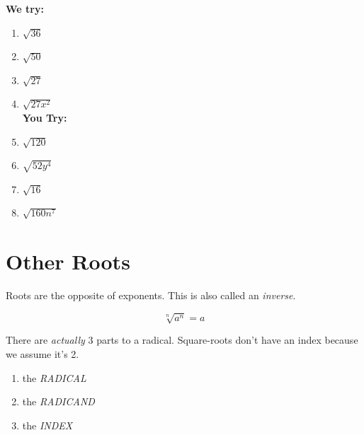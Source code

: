 \documentclass[12pt]{article}
\begin{document}
\begin{multicols}{2}
\textbf{We try:}\\

\begin{enumerate}
	\setlength\itemsep{1cm}

	\item $\sqrt{36}$\\
	
	
	\item $\sqrt{50}$\\
	
	
	\item $\sqrt{27}$\\
	
	
	\item $\sqrt{27x^2}$\\
	
		
\textbf{You Try:}\\
	
	\item  $\sqrt{120}$ \\
	
	
	\item $\sqrt{52y^4}$\\
	
	
	\item $\sqrt{16}$\\
	
	
	\item $\sqrt{160n^7}$\\
	
	

\end{enumerate}
\end{multicols}


\section{Other Roots}

Roots are the opposite of exponents. This is also called an \textit{inverse}.\\

\begin{LARGE}
	$$\sqrt[n]{a^n}=a$$
\end{LARGE}



\hrulefill

There are \textit{actually} 3 parts to a radical. Square-roots don't have an index because we assume it's 2.

\begin{enumerate}

	\item the \textit{RADICAL}\\
	
	\item the \textit{RADICAND}\\
	
	\item the \textit{INDEX}\\
\end{enumerate}
\end{document}
